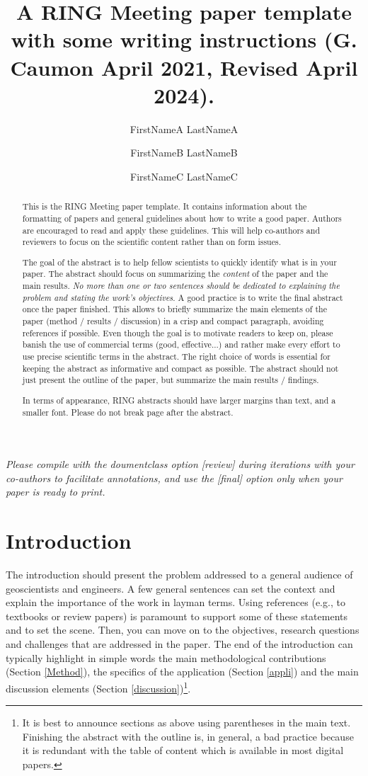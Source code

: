 \documentclass[final]{ring}
\title{A RING Meeting paper template with some writing instructions \newline (G. Caumon April 2021, Revised April 2024).}
\author[1]{FirstNameA LastNameA}
\author[2]{FirstNameB LastNameB}
\author[1,2]{FirstNameC LastNameC}
\affil[1]{RING, GeoRessources / ENSG, Université de Lorraine / CNRS, F-54000 Nancy}
\affil[2]{Team, Laboratory, Organization, Zip code, Country}
\begin{document}
\maketitle

\begin{abstract}

This is the RING Meeting paper template. It contains information about the formatting of papers and general guidelines about how to write a good paper. Authors are encouraged to read and apply these guidelines. This will help co-authors and reviewers to focus on the scientific content rather than on form issues. 

The goal of the abstract is to help fellow scientists to quickly identify what is in your paper. The abstract should focus on summarizing the \emph{content} of the paper and the main results. \emph{No more than one or two sentences should be dedicated to explaining the problem and stating the work’s objectives}. A good practice is to write the final abstract once the paper finished. This allows to briefly summarize the main elements of the paper (method / results / discussion) in a crisp and compact paragraph, avoiding references if possible. Even though the goal is to motivate readers to keep on, please banish the use of commercial terms (good, effective...) and rather make every effort to use precise scientific terms in the abstract. The right choice of words is essential for keeping the abstract as informative and compact as possible. The abstract should not just present the outline of the paper, but summarize the main results / findings. 

In terms of appearance, RING abstracts should have larger margins than text, and a smaller font. Please do not break page after the abstract.

\end{abstract}

\emph{Please compile with the doumentclass option [review] during iterations with your co-authors to facilitate annotations, and use the [final] option only when your paper is ready to print.}


\section*{Introduction}

The introduction should present the problem addressed to a general audience of geoscientists and engineers. A few general sentences can set the context and explain the importance of the work in layman terms. Using references (e.g., to textbooks or review papers) is paramount to support some of these statements and to set the scene. Then, you can move on to the objectives, research questions and challenges that are addressed in the paper. The end of the introduction can typically highlight in simple words the main methodological contributions (Section \ref{Method}), the specifics of the application (Section \ref{appli}) and the main discussion elements (Section \ref{discussion})\footnote{It is best to announce sections as above using parentheses in the main text. Finishing the abstract with the outline is, in general, a bad practice because it is redundant with the table of content which is available in most digital papers.}.
\end{document}
